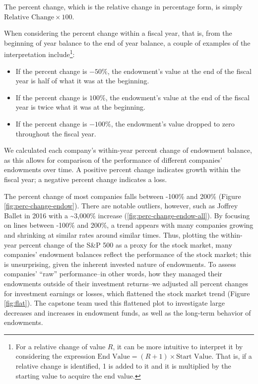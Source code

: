 \documentclass[Dance Data
Project,article,submit,moreauthors,pdftex]{mdpi}
\providecommand{\tightlist}{%
  \setlength{\itemsep}{0pt}\setlength{\parskip}{0pt}}
\begin{document}
The percent change, which is the relative change in percentage form, is
simply \(\text{Relative Change} \times 100\).

When considering the percent change within a fiscal year, that is, from
the beginning of year balance to the end of year balance, a couple of
examples of the interpretation include\footnote{For a relative change of
  value \(R\), it can be more intuitive to interpret it by considering
  the expression \(\text{End Value} = (R+1) \times \text{Start Value}.\)
  That is, if a relative change is identified, 1 is added to it and it
  is multiplied by the starting value to acquire the end value.}:

\begin{itemize}
\tightlist
\item
  If the percent change is \(-50\%\), the endowment's value at the end
  of the fiscal year is half of what it was at the beginning.
\item
  If the percent change is \(100\%\), the endowment's value at the end
  of the fiscal year is twice what it was at the beginning.\\
\item
  If the percent change is \(-100\%\), the endowment's value dropped to
  zero throughout the fiscal year.
\end{itemize}

We calculated each company's within-year percent change of endowment
balance, as this allows for comparison of the performance of different
companies' endowments over time. A positive percent change indicates
growth within the fiscal year; a negative percent change indicates a
loss.

The percent change of most companies falls between -100\% and 200\%
(Figure \ref{fig:perc-change-endow}). There are notable outliers,
however, such as Joffrey Ballet in 2016 with a \textasciitilde3,000\%
increase (\ref{fig:perc-change-endow-all}). By focusing on lines between
-100\% and 200\%, a trend appears with many companies growing and
shrinking at similar rates around similar times. Thus, plotting the
within-year percent change of the S\&P 500 as a proxy for the stock
market, many companies' endowment balances reflect the performance of
the stock market; this is unsurprising, given the inherent invested
nature of endowments. To assess companies' ``raw'' performance--in other
words, how they managed their endowments outside of their investment
returns--we adjusted all percent changes for investment earnings or
losses, which flattened the stock market trend (Figure \ref{fig:flat}).
The capstone team used this flattened plot to investigate large
decreases and increases in endowment funds, as well as the long-term
behavior of endowments.
\end{document}
